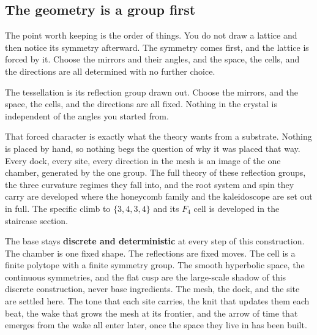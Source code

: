 \subsection{The geometry is a group first}

The point worth keeping is the order of things. You do not draw a lattice and then notice its symmetry afterward. The symmetry comes first, and the lattice is forced by it. Choose the mirrors and their angles, and the space, the cells, and the directions are all determined with no further choice.

\begin{principle}
The tessellation is its reflection group drawn out. Choose the mirrors, and the space, the cells, and the directions are all fixed. Nothing in the crystal is independent of the angles you started from.
\end{principle}

That forced character is exactly what the theory wants from a substrate. Nothing is placed by hand, so nothing begs the question of why it was placed that way. Every dock, every site, every direction in the mesh is an image of the one chamber, generated by the one group. The full theory of these reflection groups, the three curvature regimes they fall into, and the root system and spin they carry are developed where the honeycomb family and the kaleidoscope are set out in full. The specific climb to $\{3,4,3,4\}$ and its $F_4$ cell is developed in the staircase section.

The base stays \textbf{discrete and deterministic} at every step of this construction. The chamber is one fixed shape. The reflections are fixed moves. The cell is a finite polytope with a finite symmetry group. The smooth hyperbolic space, the continuous symmetries, and the flat cusp are the large-scale shadow of this discrete construction, never base ingredients. The mesh, the dock, and the site are settled here. The tone that each site carries, the knit that updates them each beat, the wake that grows the mesh at its frontier, and the arrow of time that emerges from the wake all enter later, once the space they live in has been built.

